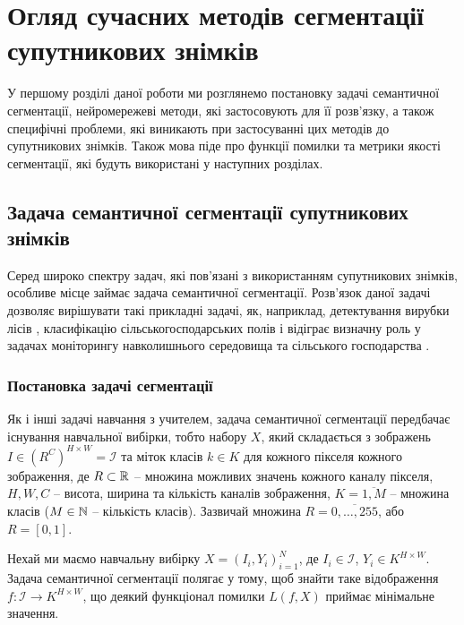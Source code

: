 
\chapter{Огляд сучасних методів сегментації супутникових знімків}
\label{chap:review}  %

У першому розділі даної роботи ми розглянемо постановку
задачі семантичної сегментації, нейромережеві методи, які
застосовують для її розв'язку, а також специфічні проблеми,
які виникають при застосуванні цих методів до супутникових
знімків. Також мова піде про функції помилки та метрики якості
сегментації, які будуть використані у наступних розділах.

\section{Задача семантичної сегментації супутникових знімків}

Серед широко спектру задач, які пов'язані з використанням
супутникових знімків, особливе місце займає задача семантичної
сегментації. Розв'язок даної задачі дозволяє вирішувати такі прикладні задачі,
як, наприклад, детектування вирубки лісів \cite{sat_logging}, класифікацію
сільськогосподарських полів \cite{kussul2017deep}
і відіграє визначну роль у задачах моніторингу навколишнього
середовища та сільського господарства \cite{kolotii2015comparison}.

\subsection{Постановка задачі сегментації}

Як і інші задачі навчання з учителем, задача семантичної сегментації
передбачає існування навчальної вибірки, тобто набору $X$,
який складається з зображень
$I \in \left( R^C \right)^{H \times W} = \mathcal{I}$ та міток класів
$k \in K$ для кожного пікселя кожного зображення, де $R \subset \operatorname{\mathbb{R}}$ --
множина можливих значень кожного каналу пікселя,
$H, W, C$ -- висота, ширина та кількість каналів зображення,
$K = \overline{1, M}$ -- множина класів ($M \in \operatorname{\mathbb{N}}$ -- кількість класів).
Зазвичай множина $R = \overline{0, \dots, 255}$, або $R = [0, 1]$.

\begin{definition}\label{def:sem_segm_task}
    Нехай ми маємо навчальну вибірку $X=(I_i, Y_i)_{i=1}^{N}$,
    де $I_i \in \mathcal{I}$, $Y_i \in K^{H \times W}$.
    Задача семантичної сегментації полягає у тому, щоб
    знайти таке відображення
    $f: \mathcal{I} \rightarrow K^{H \times W}$, що деякий функціонал помилки
    $L(f, X)$ приймає мінімальне значення.
\end{definition}

